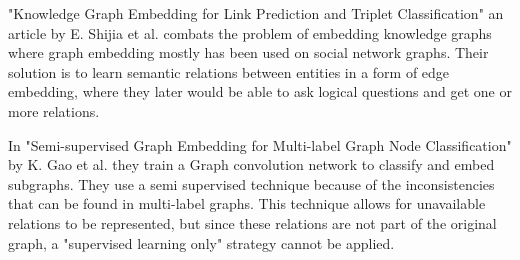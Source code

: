 "Knowledge Graph Embedding for Link Prediction and Triplet Classification" an article by E. Shijia et al. \cite{10.1007/978-981-10-3168-7_23} combats the problem of embedding knowledge graphs where graph embedding mostly has been used on social network graphs. Their solution is to learn semantic relations between entities in a form of edge embedding, where they later would be able to ask logical questions and get one or more relations.

In "Semi-supervised Graph Embedding for Multi-label Graph Node Classification" by K. Gao et al.\cite{10.1007/978-3-030-34223-4_35} they train a Graph convolution network to classify and embed subgraphs. They use a semi supervised technique because of the inconsistencies that can be found in multi-label graphs. This technique allows for unavailable relations to be represented, but since these relations are not part of the original graph, a "supervised learning only" strategy cannot be applied.
